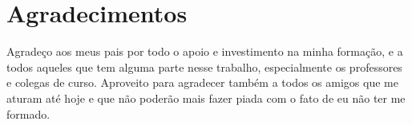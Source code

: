 \chapter*{Agradecimentos}

Agradeço aos meus pais por todo o apoio e investimento na minha formação, e a todos aqueles que tem alguma parte nesse trabalho, especialmente os professores e colegas de curso. Aproveito para agradecer também a todos os amigos que me aturam até hoje e que não poderão mais fazer piada com o fato de eu não ter me formado.